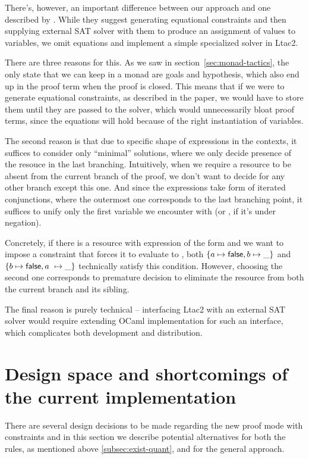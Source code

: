There's, however, an important difference between our approach and one described by \citet{harlandResourceDistributionBooleanConstraints2003}.
While they suggest generating equational constraints and then supplying external SAT solver with them to produce an assignment of values to variables, we omit equations and implement a simple specialized solver in Ltac2.

There are three reasons for this.
As we saw in section~\ref{sec:monad-tactics}, the only state that we can keep in a monad are goals and hypothesis, which also end up in the proof term when the proof is closed.
This means that if we were to generate equational constraints, as described in the paper, we would have to store them until they are passed to the solver, which would unnecessarily bloat proof terms, since the equations will hold because of the right instantiation of variables.

The second reason is that due to specific shape of expressions in the contexts, it suffices to consider only ``minimal'' solutions, where we only decide presence of the resouce in the last branching.
Intuitively, when we require a resource to be absent from the current branch of the proof, we don't want to decide for any other branch except this one.
And since the expressions take form of iterated conjunctions, where the outermost one corresponds to the last branching point, it suffices to unify only the first variable we encounter with \false (or \true, if it's under negation).

Concretely, if there is a resource with expression of the form  and we want to impose a constraint that forces it to evaluate to \false, both \(\left\{a \mapsto \textsf{false}, b \mapsto \_\right\} \) and \(\left\{b \mapsto \textsf{false}, a\ \mapsto \_\right\}\) technically satisfy this condition.
However, choosing the second one corresponds to premature decision to eliminate the resource from both the current branch and its sibling.

The final reason is purely technical -- interfacing Ltac2 with an external SAT solver would require extending OCaml implementation for such an interface, which complicates both development and distribution.

\section{Design space and shortcomings of the current implementation}
\label{sec:poss-designs-comp}

There are several design decisions to be made regarding the new proof mode with constraints and in this section we describe potential alternatives for both the rules, as mentioned above \ref{subsec:exist-quant}, and for the general approach.

